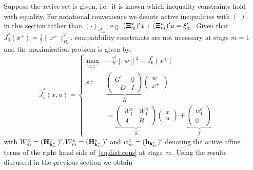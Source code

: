 \documentclass[journal]{IEEEtran}
\providecommand{\norm}[1]{\left\|#1\right\|}
\theoremstyle{remark}
\theoremstyle{definition}
\begin{document}
%
Suppose the active set is given, i.e.~it is known which inequality constraints hold with equality. 
%
For notational convenience we denote active inequalities with $(\cdot)^\prime$ in this section rather than 
$(\cdot)_{\mathcal A_m}$, e.g.  $({\bf{\Xi}}^x_m)^\prime x + ({\bf{\Xi}}^u_m)^\prime u = {\bf{\xi}}_m^\prime$. 
%
Given that $J^\ast_0(x^+) = \frac{1}{2}\|x^+\|_{P_0}^2$, compatibility constraints are not necessary at 
stage $m=1$ and the maximisation problem is given by:
%
\[
  \hat J_1^\ast(x,u) = \left\{\begin{split}
  \max_{w,x^+} \ & {-\frac{\gamma^2}{2}}\norm{w}^2 + J_{0}^\ast(x^+)\\
  \text{s.t. }\ & 
  \underbrace{\left(\begin{array}{cc}
  G^\prime & 0 \\ -D & I
  \end{array}\right)}_{\bar H}
  \left(\begin{array}{c}w\\ x^+\end{array}\right)
  \\&= \underbrace{\left(\begin{array}{cc}W_1^x & W_1^u \\ A & B\end{array}\right)}_{
  \bar S
  }
  \left(\begin{array}{c}x \\ u \end{array}\right) + \underbrace{\left(\begin{array}{c}
  w_1^c \\ 0\end{array}\right)}_{\bar f}
  \end{split}\right.
\]
%
with $W_m^x = ({\bf{H}}_{{\bf{k}}_m^\ast}^x)^\prime, W_m^u = ({\bf{H}}_{{\bf{k}}_m^\ast}^u)^\prime $ 
and $w_m^c = ({\bf{h}}_{{\bf{k}}_m^\ast})^\prime$ denoting the active affine terms of the right hand side 
of~\eqref{eq:dist:cons} at stage~$m$.
%
Using the results discussed in the previous section we obtain
%
\end{document}
